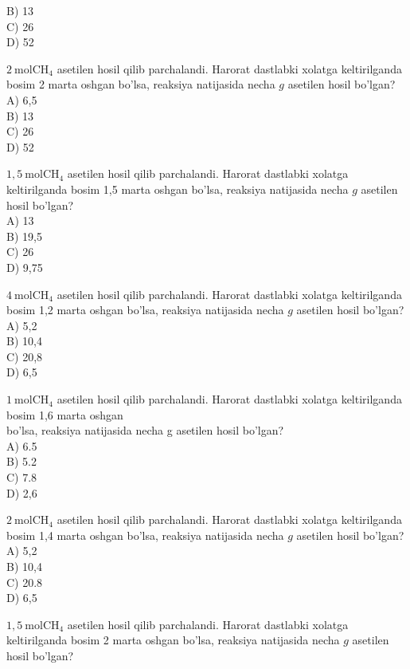 B) 13\\
C) 26\\
D) 52\\
  \item $2 \mathrm{~mol} \mathrm{CH}_{4}$ asetilen hosil qilib parchalandi. Harorat dastlabki xolatga keltirilganda bosim 2 marta oshgan bo'lsa, reaksiya natijasida necha $g$ asetilen hosil bo'lgan?\\
A) 6,5\\
B) 13\\
C) 26\\
D) 52
  \item $1,5 \mathrm{~mol} \mathrm{CH}_{4}$ asetilen hosil qilib parchalandi. Harorat dastlabki xolatga keltirilganda bosim 1,5 marta oshgan bo'lsa, reaksiya natijasida necha $g$ asetilen hosil bo'lgan?\\
A) 13\\
B) 19,5\\
C) 26\\
D) 9,75
  \item $4 \mathrm{~mol} \mathrm{CH}_{4}$ asetilen hosil qilib parchalandi. Harorat dastlabki xolatga keltirilganda bosim 1,2 marta oshgan bo'lsa, reaksiya natijasida necha $g$ asetilen hosil bo'lgan?\\
A) 5,2\\
B) 10,4\\
C) 20,8\\
D) 6,5
  \item $1 \mathrm{~mol} \mathrm{CH}_{4}$ asetilen hosil qilib parchalandi. Harorat dastlabki xolatga keltirilganda bosim 1,6 marta oshgan\\
bo'lsa, reaksiya natijasida necha g asetilen hosil bo'lgan?\\
A) 6.5\\
B) 5.2\\
C) 7.8\\
D) 2,6
  \item $2 \mathrm{~mol} \mathrm{CH}_{4}$ asetilen hosil qilib parchalandi. Harorat dastlabki xolatga keltirilganda bosim 1,4 marta oshgan bo'lsa, reaksiya natijasida necha $g$ asetilen hosil bo'lgan?\\
A) 5,2\\
B) 10,4\\
C) 20.8\\
D) 6,5
  \item $1,5 \mathrm{~mol} \mathrm{CH}_{4}$ asetilen hosil qilib parchalandi. Harorat dastlabki xolatga keltirilganda bosim 2 marta oshgan bo'lsa, reaksiya natijasida necha $g$ asetilen hosil bo'lgan?\\
